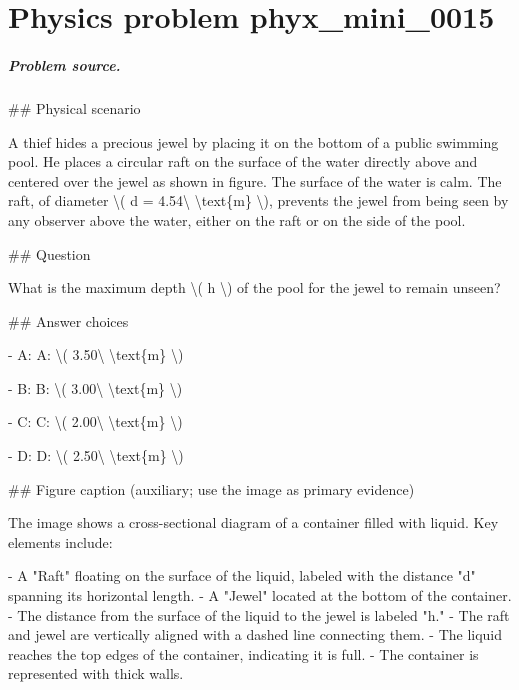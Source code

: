 
\chapter{Physics problem phyx\_mini\_0015}
\label{ch:PhyXMiniProblems_problem_phyx_mini_0015}

\paragraph{Problem source.}
\#\# Physical scenario

A thief hides a precious jewel by placing it on the bottom of a public swimming pool. He places a circular raft on the surface of the water directly above and centered over the jewel as shown in figure. The surface of the water is calm.
The raft, of diameter \textbackslash{}( d = 4.54\textbackslash{} \textbackslash{}text\{m\} \textbackslash{}), prevents the jewel from being seen by any observer above the water, either on the raft or on the side of the pool.

\#\# Question

What is the maximum depth \textbackslash{}( h \textbackslash{}) of the pool for the jewel to remain unseen?

\#\# Answer choices

- A: A: \textbackslash{}( 3.50\textbackslash{} \textbackslash{}text\{m\} \textbackslash{})

- B: B: \textbackslash{}( 3.00\textbackslash{} \textbackslash{}text\{m\} \textbackslash{})

- C: C: \textbackslash{}( 2.00\textbackslash{} \textbackslash{}text\{m\} \textbackslash{})

- D: D: \textbackslash{}( 2.50\textbackslash{} \textbackslash{}text\{m\} \textbackslash{})

\#\# Figure caption (auxiliary; use the image as primary evidence)

The image shows a cross-sectional diagram of a container filled with liquid. Key elements include:

- A "Raft" floating on the surface of the liquid, labeled with the distance "d" spanning its horizontal length.
- A "Jewel" located at the bottom of the container.
- The distance from the surface of the liquid to the jewel is labeled "h."
- The raft and jewel are vertically aligned with a dashed line connecting them.
- The liquid reaches the top edges of the container, indicating it is full. 
- The container is represented with thick walls.

